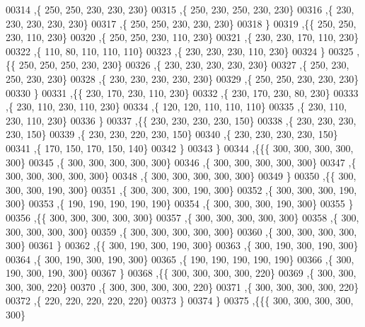 \begin{DoxyCode}
00314    ,\{   250,   250,   230,   230,   230\}
00315    ,\{   250,   230,   250,   230,   230\}
00316    ,\{   230,   230,   230,   230,   230\}
00317    ,\{   250,   250,   230,   230,   230\}
00318    \}
00319   ,\{\{   250,   250,   230,   110,   230\}
00320    ,\{   250,   250,   230,   110,   230\}
00321    ,\{   230,   230,   170,   110,   230\}
00322    ,\{   110,    80,   110,   110,   110\}
00323    ,\{   230,   230,   230,   110,   230\}
00324    \}
00325   ,\{\{   250,   250,   250,   230,   230\}
00326    ,\{   230,   230,   230,   230,   230\}
00327    ,\{   250,   230,   250,   230,   230\}
00328    ,\{   230,   230,   230,   230,   230\}
00329    ,\{   250,   250,   230,   230,   230\}
00330    \}
00331   ,\{\{   230,   170,   230,   110,   230\}
00332    ,\{   230,   170,   230,    80,   230\}
00333    ,\{   230,   110,   230,   110,   230\}
00334    ,\{   120,   120,   110,   110,   110\}
00335    ,\{   230,   110,   230,   110,   230\}
00336    \}
00337   ,\{\{   230,   230,   230,   230,   150\}
00338    ,\{   230,   230,   230,   230,   150\}
00339    ,\{   230,   230,   220,   230,   150\}
00340    ,\{   230,   230,   230,   230,   150\}
00341    ,\{   170,   150,   170,   150,   140\}
00342    \}
00343   \}
00344  ,\{\{\{   300,   300,   300,   300,   300\}
00345    ,\{   300,   300,   300,   300,   300\}
00346    ,\{   300,   300,   300,   300,   300\}
00347    ,\{   300,   300,   300,   300,   300\}
00348    ,\{   300,   300,   300,   300,   300\}
00349    \}
00350   ,\{\{   300,   300,   300,   190,   300\}
00351    ,\{   300,   300,   300,   190,   300\}
00352    ,\{   300,   300,   300,   190,   300\}
00353    ,\{   190,   190,   190,   190,   190\}
00354    ,\{   300,   300,   300,   190,   300\}
00355    \}
00356   ,\{\{   300,   300,   300,   300,   300\}
00357    ,\{   300,   300,   300,   300,   300\}
00358    ,\{   300,   300,   300,   300,   300\}
00359    ,\{   300,   300,   300,   300,   300\}
00360    ,\{   300,   300,   300,   300,   300\}
00361    \}
00362   ,\{\{   300,   190,   300,   190,   300\}
00363    ,\{   300,   190,   300,   190,   300\}
00364    ,\{   300,   190,   300,   190,   300\}
00365    ,\{   190,   190,   190,   190,   190\}
00366    ,\{   300,   190,   300,   190,   300\}
00367    \}
00368   ,\{\{   300,   300,   300,   300,   220\}
00369    ,\{   300,   300,   300,   300,   220\}
00370    ,\{   300,   300,   300,   300,   220\}
00371    ,\{   300,   300,   300,   300,   220\}
00372    ,\{   220,   220,   220,   220,   220\}
00373    \}
00374   \}
00375  ,\{\{\{   300,   300,   300,   300,   300\}

\end{DoxyCode}
